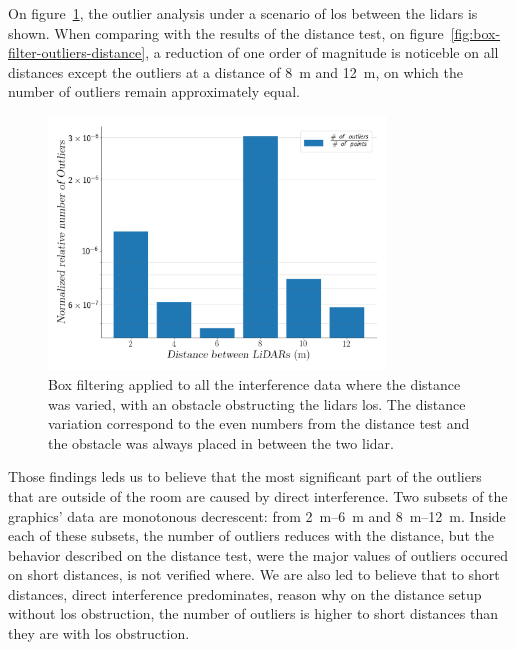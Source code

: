 On figure~\ref{fig:box-filter-outliers-LOS}, the outlier analysis under a scenario of \ac{los} between the \acp{lidar} is shown. When comparing with the results of the distance test, on figure~\ref{fig:box-filter-outliers-distance}, a reduction of one order of magnitude is noticeble on all distances except the outliers at a distance of \SI{8}{\meter} and \SI{12}{\meter}, on which the number of outliers remain approximately equal. 

\begin{figure}[!ht]
	\centering
	\includegraphics[width=0.8\textwidth]{img/lidar-interference/box-filtering/interference-box-filter-outliers-LOS.png}
	\caption{Box filtering applied to all the interference data where the distance was varied, with an obstacle obstructing the \acp{lidar} \ac{los}. The distance variation correspond to the even numbers from the distance test and the obstacle was always placed in between the two \ac{lidar}.}
	\label{fig:box-filter-outliers-LOS}
\end{figure}

Those findings leds us to believe that the most significant part of the outliers that are outside of the room are caused by direct interference. Two subsets of the graphics' data are monotonous decrescent: from \SIrange{2}{6}{\meter} and \SIrange{8}{12}{\meter}. Inside each of these subsets, the number of outliers reduces with the distance, but the behavior described on the distance test, were the major values of outliers occured on short distances, is not verified where. We are also led to believe that to short distances, direct interference predominates, reason why on the distance setup without \ac{los} obstruction, the number of outliers is higher to short distances than they are with \ac{los} obstruction.

